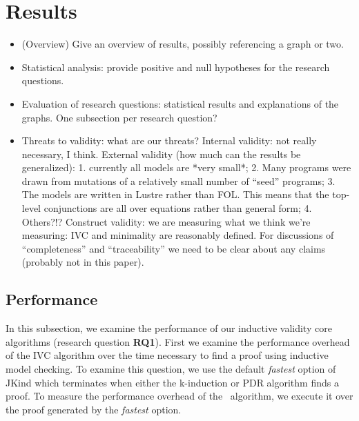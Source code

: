 \section{Results}

\newcommand{\takeaway}[1]{
\vspace{6pt}
\noindent\fbox{\parbox{\columnwidth}{#1}}
\vspace{6pt}
}

\begin{itemize}
    \item (Overview) Give an overview of results, possibly referencing a graph or two.
    \item Statistical analysis: provide positive and null hypotheses for the research questions.
    \item Evaluation of research questions: statistical results and explanations of the graphs.  One subsection per research question?
    \item Threats to validity: what are our threats?
    Internal validity: not really necessary, I think.
    External validity (how much can the results be generalized):
        1. currently all models are *very small*;
        2. Many programs were drawn from mutations of a relatively small number of ``seed'' programs;
        3. The models are written in Lustre rather than FOL.  This means that the
            top-level conjunctions are all over equations rather than general
            form;
        4. Others?!?
    Construct validity: we are measuring what we think we're measuring: IVC and minimality are reasonably defined.  For discussions of ``completeness'' and ``traceability'' we need to be clear about any claims (probably not in this paper).
\end{itemize}

\subsection{Performance}
\label{sec:performance}

In this subsection, we examine the performance of our inductive validity core algorithms (research question \textbf{RQ1}).  First we examine the performance overhead of the IVC algorithm over the time necessary to find a proof using inductive model checking.  To examine this question, we use the default {\em fastest} option of JKind which terminates when either the k-induction or PDR algorithm finds a proof.  To measure the performance overhead of the \ucalg\ algorithm, we execute it over the proof generated by the {\em fastest} option.

